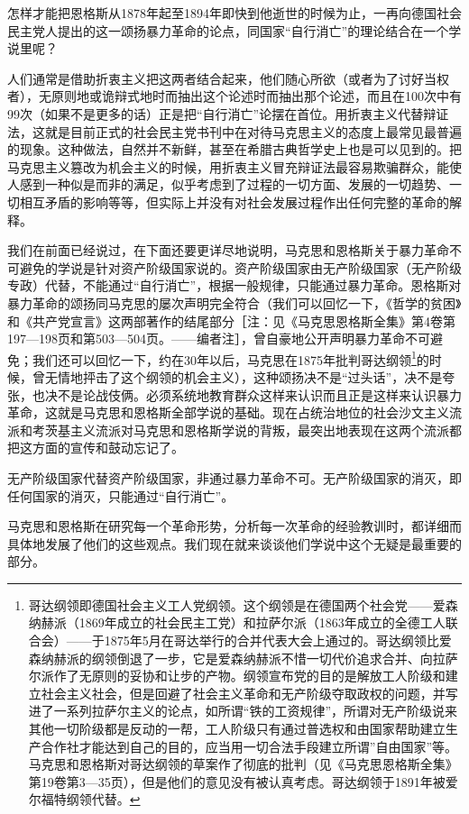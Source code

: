 \documentclass[UTF8, 12pt, a4paper]{ctexrep}
\begin{document}
怎样才能把恩格斯从1878年起至1894年即快到他逝世的时候为止，一再向德国社会民主党人提出的这一颂扬暴力革命的论点，同国家“自行消亡”的理论结合在一个学说里呢？

人们通常是借助折衷主义把这两者结合起来，他们随心所欲（或者为了讨好当权者），无原则地或诡辩式地时而抽出这个论述时而抽出那个论述，而且在100次中有99次（如果不是更多的话）正是把“自行消亡”论摆在首位。用折衷主义代替辩证法，这就是目前正式的社会民主党书刊中在对待马克思主义的态度上最常见最普遍的现象。这种做法，自然并不新鲜，甚至在希腊古典哲学史上也是可以见到的。把马克思主义篡改为机会主义的时候，用折衷主义冒充辩证法最容易欺骗群众，能使人感到一种似是而非的满足，似乎考虑到了过程的一切方面、发展的一切趋势、一切相互矛盾的影响等等，但实际上并没有对社会发展过程作出任何完整的革命的解释。

我们在前面已经说过，在下面还要更详尽地说明，马克思和恩格斯关于暴力革命不可避免的学说是针对资产阶级国家说的。资产阶级国家由无产阶级国家（无产阶级专政）代替，不能通过“自行消亡”，根据一般规律，只能通过暴力革命。恩格斯对暴力革命的颂扬同马克思的屡次声明完全符合（我们可以回忆一下，《哲学的贫困》和《共产党宣言》这两部著作的结尾部分［注：见《马克思恩格斯全集》第4卷第197—198页和第503—504页。——编者注］，曾自豪地公开声明暴力革命不可避免；我们还可以回忆一下，约在30年以后，马克思在1875年批判哥达纲领\footnote{哥达纲领即德国社会主义工人党纲领。这个纲领是在德国两个社会党——爱森纳赫派（1869年成立的社会民主工党）和拉萨尔派（1863年成立的全德工人联合会）——于1875年5月在哥达举行的合并代表大会上通过的。哥达纲领比爱森纳赫派的纲领倒退了一步，它是爱森纳赫派不惜一切代价追求合并、向拉萨尔派作了无原则的妥协和让步的产物。纲领宣布党的目的是解放工人阶级和建立社会主义社会，但是回避了社会主义革命和无产阶级夺取政权的问题，并写进了一系列拉萨尔主义的论点，如所谓“铁的工资规律”，所谓对无产阶级说来其他一切阶级都是反动的一帮，工人阶级只有通过普选权和由国家帮助建立生产合作社才能达到自己的目的，应当用一切合法手段建立所谓”自由国家”等。马克思和恩格斯对哥达纲领的草案作了彻底的批判（见《马克思恩格斯全集》第19卷第3—35页），但是他们的意见没有被认真考虑。哥达纲领于1891年被爱尔福特纲领代替。}的时候，曾无情地抨击了这个纲领的机会主义），这种颂扬决不是“过头话”，决不是夸张，也决不是论战伎俩。必须系统地教育群众这样来认识而且正是这样来认识暴力革命，这就是马克思和恩格斯全部学说的基础。现在占统治地位的社会沙文主义流派和考茨基主义流派对马克思和恩格斯学说的背叛，最突出地表现在这两个流派都把这方面的宣传和鼓动忘记了。

无产阶级国家代替资产阶级国家，非通过暴力革命不可。无产阶级国家的消灭，即任何国家的消灭，只能通过“自行消亡”。

马克思和恩格斯在研究每一个革命形势，分析每一次革命的经验教训时，都详细而具体地发展了他们的这些观点。我们现在就来谈谈他们学说中这个无疑是最重要的部分。
\end{document}
